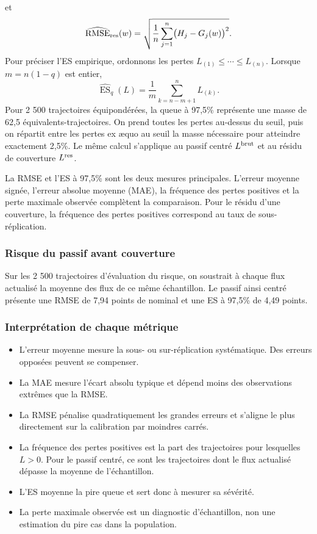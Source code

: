 \documentclass[12pt,a4paper]{article}
\newcommand{\ES}{\operatorname{ES}}
\newcommand{\RMSE}{\operatorname{RMSE}}
\newcommand{\1}{\mathbf{1}}
\begin{document}
et
\begin{equation}
 \widehat{\RMSE}_{\rm res}(w)
 =\sqrt{\frac{1}{n}\sum_{j=1}^{n}\bigl(H_j-G_j(w)\bigr)^2}.
\label{eq:empirical-residual-rmse}
\end{equation}
Pour préciser l'ES empirique, ordonnons les pertes $L_{(1)}\leq\cdots\leq L_{(n)}$. Lorsque $m=n(1-q)$ est entier,
\begin{equation}
 \widehat{\ES}_{q}(L)
 =\frac{1}{m}\sum_{k=n-m+1}^{n}L_{(k)}.
\label{eq:empirical-es}
\end{equation}
Pour 2 500 trajectoires équipondérées, la queue à 97,5\% représente une masse de 62,5 équivalents-trajectoires. On prend toutes les pertes au-dessus du seuil, puis on répartit entre les pertes ex æquo au seuil la masse nécessaire pour atteindre exactement 2,5\%. Le même calcul s'applique au passif centré $L^{\rm brut}$ et au résidu de couverture $L^{\rm res}$.

La RMSE et l'ES à 97,5\% sont les deux mesures principales. L'erreur moyenne signée, l'erreur absolue moyenne (MAE), la fréquence des pertes positives et la perte maximale observée complètent la comparaison. Pour le résidu d'une couverture, la fréquence des pertes positives correspond au taux de sous-réplication.

\subsubsection*{Risque du passif avant couverture}

Sur les 2 500 trajectoires d'évaluation du risque, on soustrait à chaque flux actualisé la moyenne des flux de ce même échantillon. Le passif ainsi centré présente une RMSE de 7,94 points de nominal et une ES à 97,5\% de 4,49 points.

\subsubsection*{Interprétation de chaque métrique}

\begin{itemize}
\item L'erreur moyenne mesure la sous- ou sur-réplication systématique. Des erreurs opposées peuvent se compenser.
\item La MAE mesure l'écart absolu typique et dépend moins des observations extrêmes que la RMSE.
\item La RMSE pénalise quadratiquement les grandes erreurs et s'aligne le plus directement sur la calibration par moindres carrés.
\item La fréquence des pertes positives est la part des trajectoires pour lesquelles $L>0$. Pour le passif centré, ce sont les trajectoires dont le flux actualisé dépasse la moyenne de l'échantillon.
\item L'ES moyenne la pire queue et sert donc à mesurer sa sévérité.
\item La perte maximale observée est un diagnostic d'échantillon, non une estimation du pire cas dans la population.
\end{itemize}
\end{document}
